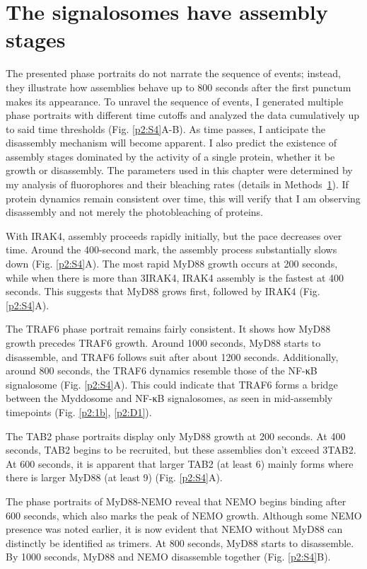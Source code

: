 \section{The signalosomes have assembly stages}
The presented phase portraits do not narrate the sequence of events; instead, they illustrate how assemblies behave up to 800 seconds after the first punctum makes its appearance. To unravel the sequence of events, I generated multiple phase portraits with different time cutoffs and analyzed the data cumulatively up to said time thresholds (Fig. \ref{p2:S4}A-B). As time passes, I anticipate the disassembly mechanism will become apparent. I also predict the existence of assembly stages dominated by the activity of a single protein, whether it be growth or disassembly. The parameters used in this chapter were determined by my analysis of fluorophores and their bleaching rates (details in Methods~\ref{}). If protein dynamics remain consistent over time, this will verify that I am observing disassembly and not merely the photobleaching of proteins.

With IRAK4, assembly proceeds rapidly initially, but the pace decreases over time. Around the 400-second mark, the assembly process substantially slows down (Fig. \ref{p2:S4}A). The most rapid MyD88 growth occurs at 200 seconds, while when there is more than 3\times IRAK4, IRAK4 assembly is the fastest at 400 seconds. This suggests that MyD88 grows first, followed by IRAK4 (Fig. \ref{p2:S4}A).

The TRAF6 phase portrait remains fairly consistent. It shows how MyD88 growth precedes TRAF6 growth. Around 1000 seconds, MyD88 starts to disassemble, and TRAF6 follows suit after about 1200 seconds. Additionally, around 800 seconds, the TRAF6 dynamics resemble those of the NF-κB signalosome (Fig. \ref{p2:S4}A). This could indicate that TRAF6 forms a bridge between the Myddosome and NF-κB signalosomes, as seen in mid-assembly timepoints (Fig. \ref{p2:1b}, \ref{p2:D1}).

The TAB2 phase portraits display only MyD88 growth at 200 seconds. At 400 seconds, TAB2 begins to be recruited, but these assemblies don't exceed 3\times TAB2. At 600 seconds, it is apparent that larger TAB2 (at least 6\times) mainly forms where there is larger MyD88 (at least 9\times) (Fig. \ref{p2:S4}A).

The phase portraits of MyD88-NEMO reveal that NEMO begins binding after 600 seconds, which also marks the peak of NEMO growth. Although some NEMO presence was noted earlier, it is now evident that NEMO without MyD88 can distinctly be identified as trimers. At 800 seconds, MyD88 starts to disassemble. By 1000 seconds, MyD88 and NEMO disassemble together (Fig. \ref{p2:S4}B).


